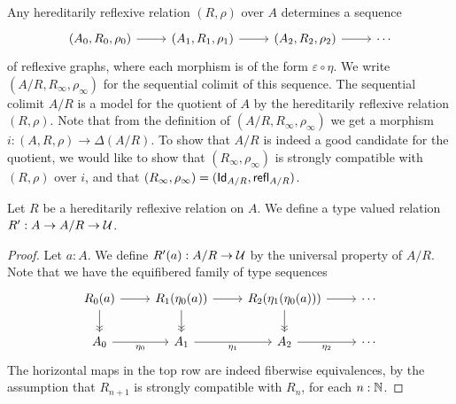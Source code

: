 \documentclass[reqno]{amsart}
\begin{document}
Any hereditarily reflexive relation $(R,\rho)$ over $A$ determines a sequence
\begin{equation*}
\begin{tikzcd}
(A_0,R_0,\rho_0) \arrow[r] & (A_1,R_1,\rho_1) \arrow[r] & (A_2,R_2,\rho_2) \arrow[r] & \cdots
\end{tikzcd}
\end{equation*}
of reflexive graphs, where each morphism is of the form $\varepsilon\circ\eta$.
We write $(A/R,R_\infty,\rho_\infty)$ for the sequential colimit of this
sequence. The sequential colimit $A/R$ is a model for the quotient of $A$ by
the hereditarily reflexive relation $(R,\rho)$. Note that from the definition
of $(A/R,R_\infty,\rho_\infty)$ we get a morphism $i:(A,R,\rho)\to\Delta(A/R)$.
To show that $A/R$ is indeed a good candidate for the quotient, we would like
to show that $(R_\infty,\rho_\infty)$ is strongly compatible
with $(R,\rho)$ over $i$, and that $(R_\infty,\rho_\infty)=(\mathsf{Id}_{A/R},\mathsf{refl}_{A/R})$. 

\begin{comment}
A quick way to see that the sequential colimit should be of the form $\Delta(A/R)$, 
is that each composite $\varepsilon\circ\eta$ is a factorization through
a discrete reflexive graph, and the discrete reflexive graphs form a lex submodel
of the model of all reflexive graphs.

\begin{proposal}
To formalize that the discrete graphs form a lex submodel of the reflexive graphs,
and that this is closed under colimits.
\end{proposal}
\end{comment}

\begin{defn}
Let $R$ be a hereditarily reflexive relation on $A$. We define a type
valued relation $R':A\to A/R\to\mathcal{U}$.
\end{defn}

\begin{proof}
Let $a:A$. We define $R'(a):A/R\to\mathcal{U}$ by the universal property of $A/R$. 
Note that we have the equifibered family of type sequences
\begin{equation*}
\begin{tikzcd}
R_0(a) \arrow[d,->>] \arrow[r] & R_1(\eta_0(a)) \arrow[d,->>] \arrow[r] & R_2(\eta_1(\eta_0(a))) \arrow[d,->>] \arrow[r] & \cdots
  \\
A_0 \arrow[r,swap,"\eta_0"] & A_1 \arrow[r,swap,"\eta_1"] & A_2 \arrow[r,swap,"\eta_2"] & \cdots
\end{tikzcd}
\end{equation*}
The horizontal maps in the top row are indeed fiberwise equivalences, by the
assumption that $R_{n+1}$ is strongly compatible with $R_n$, for each
$n:\mathbb{N}$. 
\end{proof}
\end{document}
